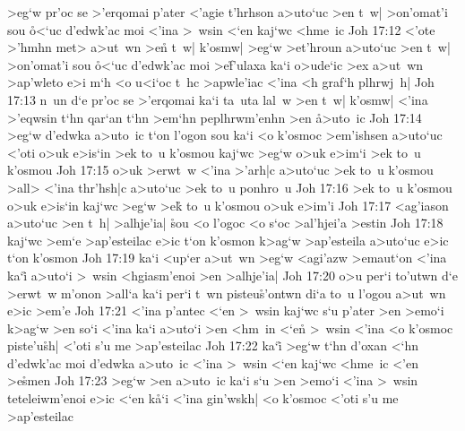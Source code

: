 >eg`w
pr'oc
se
>'erqomai
p'ater
<'agie
t'hrhson
a>uto`uc
>en
t~w|
>on'omat'i
sou
\r{o}<`uc
d'edwk'ac
moi
<'ina
>~wsin
<`en
kaj`wc
<hme~ic\bibvsend
\vs Joh 17:12
<'ote
>'hmhn
met>
a>ut~wn
>en\r{}
t~w|
k'osmw|
>eg`w
>et'hroun
a>uto`uc
>en
t~w|
>on'omat'i
sou
\r{o}<`uc
d'edwk'ac
moi
>e\r{f}'ulaxa
ka`i
o>ude`ic
>ex
a>ut~wn
>ap'wleto
e>i
m`h
<o
u<i`oc
t~hc
>apwle'iac
<'ina
<h
graf`h
plhrwj~h|\bibvsend
\vs Joh 17:13
n~un
d`e
pr'oc
se
>'erqomai
ka`i
ta~uta
lal~w
>en
t~w|
k'osmw|
<'ina
>'eqwsin
t`hn
qar`an
t`hn
>em`hn
peplhrwm'enhn
>en
\r{a}>uto~ic\bibvsend
{}
\vs Joh 17:14
>eg`w
d'edwka
a>uto~ic
t`on
l'ogon
sou
ka`i
<o
k'osmoc
>em'ishsen
a>uto`uc
<'oti
o>uk
e>is`in
>ek
to~u
k'osmou
kaj`wc
>eg`w
o>uk
e>im`i
>ek
to~u
k'osmou\bibvsend
\vs Joh 17:15
o>uk
>erwt~w
<'ina
>'arh|c
a>uto`uc
>ek
to~u
k'osmou
>all>
<'ina
thr'hsh|c
a>uto`uc
>ek
to~u
ponhro~u\bibvsend
\vs Joh 17:16
>ek
to~u
k'osmou
o>uk
e>is`in
kaj`wc
>eg`w
>ek\r{}
to~u
k'osmou
o>uk
e>im'i\bibvsend
\vs Joh 17:17
<ag'iason
a>uto`uc
>en
t~h|
>alhje'ia|
\r{s}ou
<o
l'ogoc
<o
s`oc
>al'hjei'a
>estin\bibvsend
\vs Joh 17:18
kaj`wc
>em`e
>ap'esteilac
e>ic
t`on
k'osmon
k>ag`w
>ap'esteila
a>uto`uc
e>ic
t`on
k'osmon\bibvsend
\vs Joh 17:19
ka`i
<up`er
a>ut~wn
>eg`w
<agi'azw
>emaut`on
<'ina
ka`i\r{}
a>uto`i
>~wsin
<hgiasm'enoi
>en
>alhje'ia|\bibvsend
\vs Joh 17:20
o>u
per`i
to'utwn
d`e
>erwt~w
m'onon
>all`a
ka`i
per`i
t~wn
pisteu\r{s}'ontwn
di`a
to~u
l'ogou
a>ut~wn
e>ic
>em'e\bibvsend
\vs Joh 17:21
<'ina
p'antec
<`en
>~wsin
kaj`wc
s`u
p'ater
>en
>emo`i
k>ag`w
>en
so`i
<'ina
ka`i
a>uto`i
>en
<hm~in
<`e\r{n}
>~wsin
<'ina
<o
k'osmoc
piste'u\r{s}h|
<'oti
s'u
me
>ap'esteilac\bibvsend
\vs Joh 17:22
ka`i\r{}
>eg`w
t`hn
d'oxan
<`hn
d'edwk'ac
moi
d'edwka
a>uto~ic
<'ina
>~wsin
<`en
kaj`wc
<hme~ic
<'en
>e\r{s}men\bibvsend
{}
\vs Joh 17:23
>eg`w
>en
a>uto~ic
ka`i
s`u
>en
>emo`i
<'ina
>~wsin
teteleiwm'enoi
e>ic
<`en
k\r{a}`i
<'ina
gin'wskh|
<o
k'osmoc
<'oti
s'u
me
>ap'esteilac
